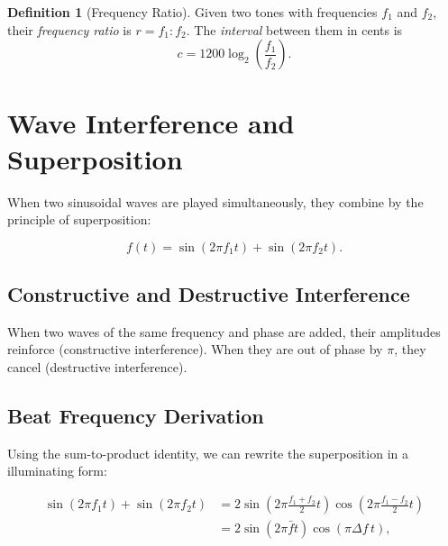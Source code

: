 \documentclass[11pt]{article}
\theoremstyle{definition}
\newtheorem{definition}{Definition}[section]
\begin{document}
\begin{definition}[Frequency Ratio]
Given two tones with frequencies $f_1$ and $f_2$, their \emph{frequency ratio} is $r = f_1 : f_2$. The \emph{interval} between them in cents is
\[
c = 1200 \log_2\left(\frac{f_1}{f_2}\right).
\]
\end{definition}

\section{Wave Interference and Superposition}

When two sinusoidal waves are played simultaneously, they combine by the principle of superposition:

\begin{equation}
    f(t) = \sin(2\pi f_1 t) + \sin(2\pi f_2 t).
    \label{eq:superposition}
\end{equation}

\subsection{Constructive and Destructive Interference}

When two waves of the same frequency and phase are added, their amplitudes reinforce (constructive interference). When they are out of phase by $\pi$, they cancel (destructive interference).

\begin{center}
\end{center}

\subsection{Beat Frequency Derivation}

Using the sum-to-product identity, we can rewrite the superposition in a illuminating form:

\begin{align}
    \sin(2\pi f_1 t) + \sin(2\pi f_2 t)
    &= 2 \sin\!\left(2\pi \frac{f_1 + f_2}{2} t\right) \cos\!\left(2\pi \frac{f_1 - f_2}{2} t\right) \nonumber \\
    &= 2 \sin(2\pi \bar{f} t) \cos(\pi \Delta f \, t),
    \label{eq:sumtoproduct}
\end{align}
\end{document}
